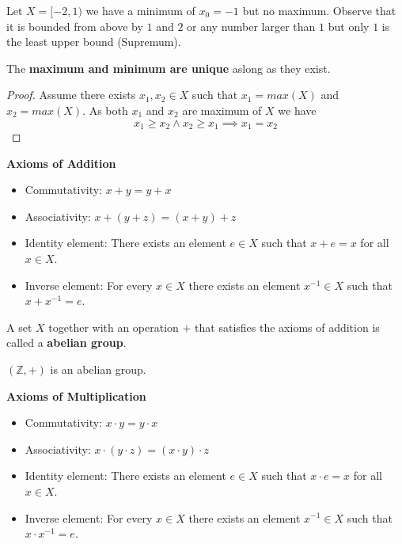 \begin{example}
    Let $X = [-2, 1)$ we have a minimum of $x_0 = -1$ but no maximum. Observe that it is bounded from above by $1$ and $2$ or any number larger than $1$ but only $1$ is the least upper bound (Supremum).
\end{example}

\begin{theorem}
    The \textbf{maximum and minimum are unique} aslong as they exist.
\end{theorem}

\begin{proof}
    Assume there exists $x_1, x_2 \in X$ such that $x_1 = max(X)$ and $x_2 = max(X)$. As both $x_1$ and $x_2$ are maximum of $X$ we have
    $$x_1 \geq x_2 \land x_2 \geq x_1 \implies x_1 = x_2$$
\end{proof}

\begin{definition}
    \textbf{Axioms of Addition}
    \begin{itemize}
        \item Commutativity: $x + y = y + x$
        \item Associativity: $x + (y + z) = (x + y) + z$
        \item Identity element: There exists an element $e \in X$ such that $x + e = x$ for all $x \in X$.
        \item Inverse element: For every $x \in X$ there exists an element $x^{-1} \in X$ such that $x + x^{-1} = e$.
    \end{itemize}
\end{definition}

\begin{remark}
    A set $X$ together with an operation $+$ that satisfies the axioms of addition is called a \textbf{abelian group}.
\end{remark}

\begin{example}
    $(\mathbb{Z}, +)$ is an abelian group.
\end{example}

\begin{definition}
    \textbf{Axioms of Multiplication}
    \begin{itemize}
        \item Commutativity: $x \cdot y = y \cdot x$
        \item Associativity: $x \cdot (y \cdot z) = (x \cdot y) \cdot z$
        \item Identity element: There exists an element $e \in X$ such that $x \cdot e = x$ for all $x \in X$.
        \item Inverse element: For every $x \in X$ there exists an element $x^{-1} \in X$ such that $x \cdot x^{-1} = e$.
    \end{itemize}
\end{definition}

